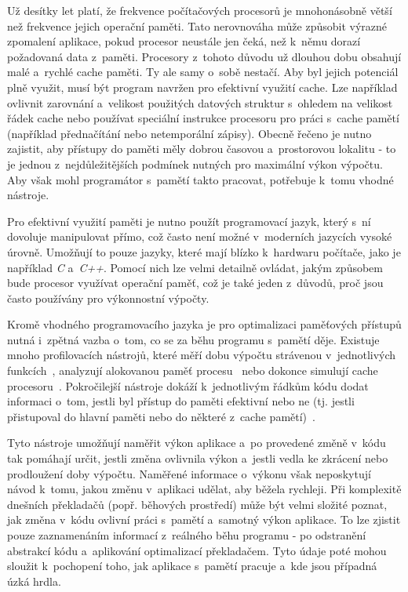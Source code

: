 Už desítky let platí, že frekvence počítačových procesorů je mnohonásobně větší než frekvence jejich operační paměti. Tato nerovnováha může způsobit výrazné zpomalení aplikace, pokud procesor neustále jen čeká, než k~němu dorazí požadovaná data z~paměti. Procesory z~tohoto důvodu už dlouhou dobu obsahují malé a~rychlé cache paměti. Ty ale samy o~sobě nestačí. Aby byl jejich potenciál plně využit, musí být program navržen pro efektivní využití cache. Lze například ovlivnit zarovnání a~velikost použitých datových struktur s~ohledem na velikost řádek cache nebo používat speciální instrukce procesoru pro práci s~cache pamětí (například přednačítání nebo netemporální zápisy). Obecně řečeno je nutno zajistit, aby přístupy do paměti měly dobrou časovou a~prostorovou lokalitu - to je jednou z~nejdůležitějších podmínek nutných pro maximální výkon výpočtu. Aby však mohl programátor s~pamětí takto pracovat, potřebuje k~tomu vhodné nástroje.

Pro efektivní využití paměti je nutno použít programovací jazyk, který s~ní dovoluje manipulovat přímo, což často není možné v~moderních jazycích vysoké úrovně. Umožňují to pouze jazyky, které mají blízko k~hardwaru počítače, jako je například \emph{C} a~\emph{C++}. Pomocí nich lze velmi detailně ovládat, jakým způsobem bude procesor využívat operační paměť, což je také jeden z~důvodů, proč jsou často používány pro výkonnostní výpočty.

Kromě vhodného programovacího jazyka je pro optimalizaci paměťových přístupů nutná i~zpětná vazba o~tom, co se za běhu programu s~pamětí děje. Existuje mnoho profilovacích nástrojů, které měří dobu výpočtu strávenou v~jednotlivých funkcích~\cite{gprof}, analyzují alokovanou paměť procesu~\cite{massif} nebo dokonce simulují cache procesoru~\cite{nethercotephd}. Pokročilejší nástroje dokáží k~jednotlivým řádkům kódu dodat informaci o~tom, jestli byl přístup do paměti efektivní nebo ne (tj. jestli přistupoval do hlavní paměti nebo do některé z~cache pamětí)~\cite{vtune}.

Tyto nástroje umožňují naměřit výkon aplikace a~po provedené změně v~kódu tak pomáhají určit, jestli změna ovlivnila výkon a~jestli vedla ke zkrácení nebo prodloužení doby výpočtu. Naměřené informace o~výkonu však neposkytují návod k~tomu, jakou změnu v~aplikaci udělat, aby běžela rychleji. Při komplexitě dnešních překladačů (popř. běhových prostředí) může být velmi složité poznat, jak změna v~kódu ovlivní práci s~pamětí a~samotný výkon aplikace. To lze zjistit pouze zaznamenáním informací z~reálného běhu programu - po odstranění abstrakcí kódu a~aplikování optimalizací překladačem. Tyto údaje poté mohou sloužit k~pochopení toho, jak aplikace s~pamětí pracuje a~kde jsou případná úzká hrdla.

